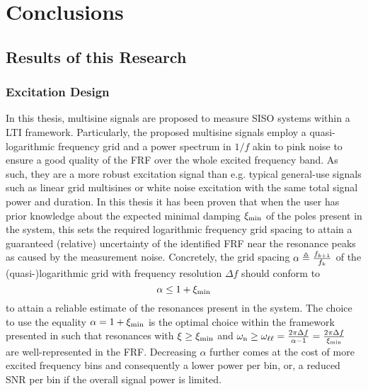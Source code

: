 \chapter{Conclusions}

\section{Results of this Research}

  \subsection{Excitation Design}
  In this thesis, multisine signals are proposed to measure \gls{SISO} systems within a \gls{LTI} framework.
  Particularly, the proposed multisine signals employ a quasi-logarithmic frequency grid and a power spectrum in $1/f$ akin to pink noise to ensure a good quality of the \gls{FRF} over the whole excited frequency band.
  As such, they are a more robust excitation signal than e.g. typical general-use signals such as linear grid multisines or white noise excitation with the same total signal power and duration.
  In this thesis it has been proven that when the user has prior knowledge about the expected minimal damping $\damping[\min]$ of the poles present in the system, this sets the required logarithmic frequency grid spacing to attain a guaranteed (relative) uncertainty of the identified \gls{FRF} near the resonance peaks as caused by the measurement noise.
  Concretely, the grid spacing $\alpha \isdef \frac{f_{k+1}}{f_k}$ of the (quasi-)logarithmic grid with frequency resolution $\Delta f$ should conform to
  \begin{equation}
    \alpha \leq 1 + \damping[\min]
  \end{equation}
  to attain a reliable estimate of the resonances present in the system.
  The choice to use the equality $\alpha = 1+ \damping[\min]$ is the optimal choice within the framework presented in  such that resonances with $\damping \geq \damping[\min]$ and $\wn \geq \omegaLinLog = \frac{2 \pi \Delta f}{\alpha-1} = \frac{2 \pi \Delta f}{\damping[\min]}$ are well-represented in the \gls{FRF}.
  Decreasing $ \alpha$ further comes at the cost of more excited frequency bins and consequently a lower power per bin, or, a reduced \gls{SNR} per bin if the overall signal power is limited.


